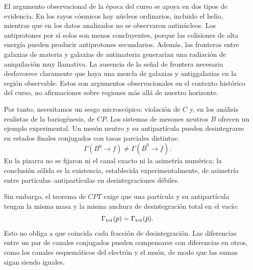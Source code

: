 El argumento observacional de la época del curso se apoya en dos tipos de evidencia. En los rayos cósmicos hay núcleos ordinarios, incluido el helio, mientras que en los datos analizados no se observaron antinúcleos. Los antiprotones por sí solos son menos concluyentes, porque las colisiones de alta energía pueden producir antiprotones secundarios. Además, las fronteras entre galaxias de materia y galaxias de antimateria generarían una radiación de aniquilación muy llamativa. La ausencia de la señal de frontera necesaria desfavorece claramente que haya una mezcla de galaxias y antiggalaxias en la región observable. Estos son argumentos observacionales en el contexto histórico del curso, no afirmaciones sobre regiones más allá de nuestro horizonte.

\begin{classroomqa}
\end{classroomqa}

Por tanto, necesitamos un sesgo microscópico: violación de \(C\) y, en los análisis realistas de la bariogénesis, de \(CP\). Los sistemas de mesones neutros \(B\) ofrecen un ejemplo experimental. Un mesón neutro y su antipartícula pueden desintegrarse en estados finales conjugados con tasas parciales distintas:
\begin{equation}
\Gamma(B^0\to f)\ne\Gamma(\bar B^0\to\bar f).
\label{eq:c08-cp-partial}
\end{equation}
En la pizarra no se fijaron ni el canal exacto ni la asimetría numérica; la conclusión sólida es la existencia, establecida experimentalmente, de asimetría entre partículas--antipartículas en desintegraciones débiles.

Sin embargo, el teorema de \(CPT\) exige que una partícula y su antipartícula tengan la misma masa y la misma anchura de desintegración total en el vacío:
\begin{equation}
\Gamma_{\rm tot}(p)=\Gamma_{\rm tot}(\bar p).
\end{equation}
Esto no obliga a que coincida cada fracción de desintegración. Las diferencias entre un par de canales conjugados pueden compensarse con diferencias en otros, como los canales esquemáticos del electrón y el muón, de modo que las sumas sigan siendo iguales.

